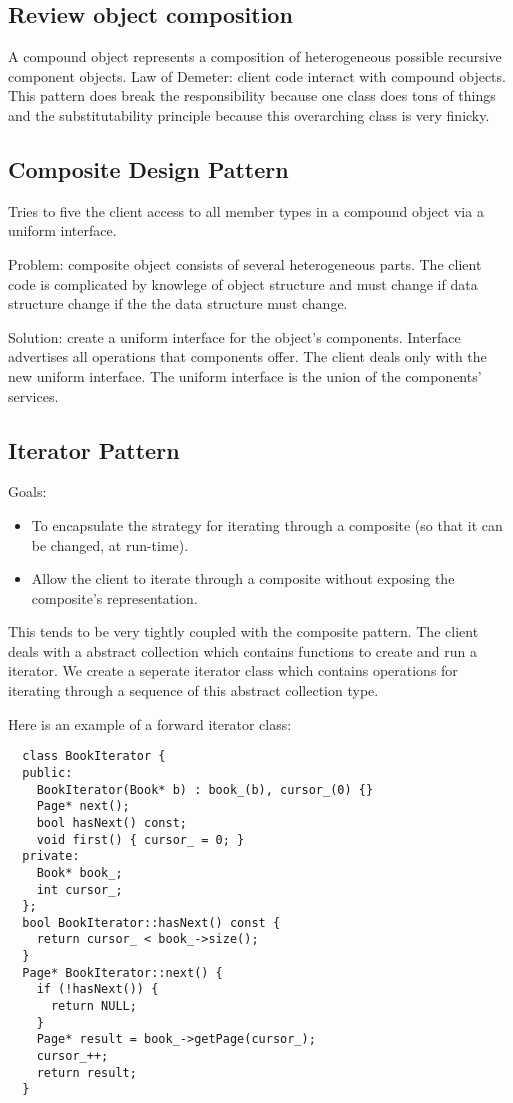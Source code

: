 \documentclass[12pt]{article}
\begin{document}
\subsection*{Review object composition}
A compound object represents a composition of heterogeneous possible recursive component objects. Law of Demeter: client code interact with compound objects. This pattern does break the responsibility because one class does tons of things and the substitutability principle because this overarching class is very finicky.

\subsection{Composite Design Pattern}
Tries to five the client access to all member types in a compound object via a uniform interface.

Problem: composite object consists of several heterogeneous parts. The client code is complicated by knowlege of object structure and must change if data structure change if the the data structure must change.

Solution: create a uniform interface for the object's components. Interface advertises all operations that components offer. The client deals only with the new uniform interface. The uniform interface is the union of the components' services.

\subsection*{Iterator Pattern}
Goals:
\begin{itemize}
\item To encapsulate the strategy for iterating through a composite (so that it can be changed, at run-time).
\item Allow the client to iterate through a composite without exposing the composite's representation.
\end{itemize}
This tends to be very tightly coupled with the composite pattern. The client deals with a abstract collection which contains functions to create and run a iterator. We create a seperate iterator class which contains operations for iterating through a sequence of this abstract collection type.

Here is an example of a forward iterator class:
\begin{lstlisting}
  class BookIterator {
  public:
    BookIterator(Book* b) : book_(b), cursor_(0) {}
    Page* next();
    bool hasNext() const;
    void first() { cursor_ = 0; }
  private:
    Book* book_;
    int cursor_;
  };
  bool BookIterator::hasNext() const {
    return cursor_ < book_->size();
  }
  Page* BookIterator::next() {
    if (!hasNext()) {
      return NULL;
    }
    Page* result = book_->getPage(cursor_);
    cursor_++;
    return result;
  }
\end{lstlisting}
\end{document}

